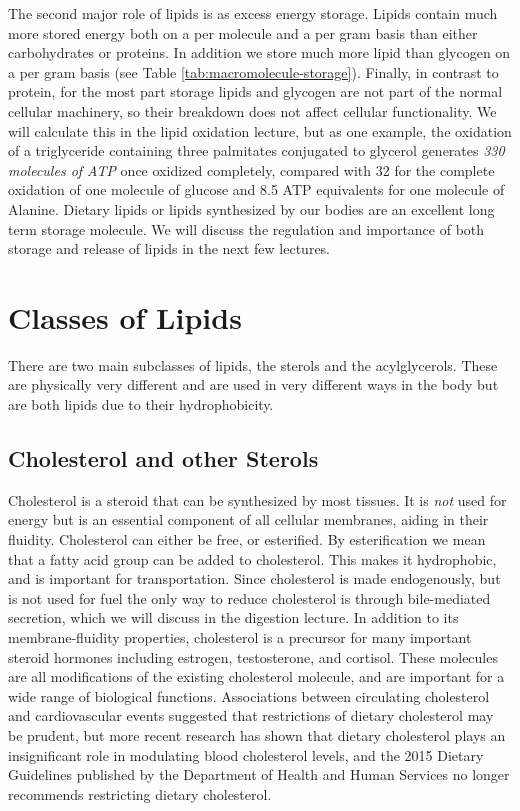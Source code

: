 \documentclass{tufte-handout}
\begin{document}
The second major role of lipids is as excess energy storage.  Lipids contain much more stored energy both on a per molecule and a per gram basis than either carbohydrates or proteins.  In addition we store much more lipid than glycogen on a per gram basis (see Table \ref{tab:macromolecule-storage}).  Finally, in contrast to protein, for the most part storage lipids and glycogen are not part of the normal cellular machinery, so their breakdown does not affect cellular functionality.  We will calculate this in the lipid oxidation lecture, but as one example, the oxidation of a triglyceride containing three palmitates conjugated to glycerol generates \emph{330 molecules of ATP} once oxidized completely, compared with 32 for the complete oxidation of one molecule of glucose and 8.5 ATP equivalents for one molecule of Alanine. Dietary lipids or lipids synthesized by our bodies are an excellent long term storage molecule.  We will discuss the regulation and importance of both storage and release of lipids in the next few lectures.

\section{Classes of Lipids}

There are two main subclasses of lipids, the sterols and the acylglycerols.  These are physically very different and are used in very different ways in the body but are both lipids due to their hydrophobicity.

\subsection{Cholesterol and other Sterols}

Cholesterol is a steroid that can be synthesized by most tissues.  It is \emph{not} used for energy but is an essential component of all cellular membranes, aiding in their fluidity.  Cholesterol can either be free, or esterified.  By esterification we mean that a fatty acid group can be added to cholesterol.  This makes it hydrophobic, and is important for transportation.  Since cholesterol is made endogenously, but is not used for fuel the only way to reduce cholesterol is through bile-mediated secretion, which we will discuss in the digestion lecture.  In addition to its membrane-fluidity properties, cholesterol is a precursor for many important steroid hormones including estrogen, testosterone, and cortisol.  These molecules are all modifications of the existing cholesterol molecule, and are important for a wide range of biological functions.  Associations between circulating cholesterol and cardiovascular events suggested that restrictions of dietary cholesterol may be prudent, but more recent research has shown that dietary cholesterol plays an insignificant role in modulating blood cholesterol levels, and the 2015 Dietary Guidelines published by the Department of Health and Human Services no longer recommends restricting dietary cholesterol\cite{USDA2015}.
\end{document}
